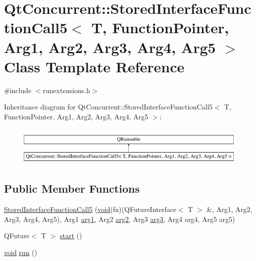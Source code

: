 \hypertarget{class_qt_concurrent_1_1_stored_interface_function_call5}{\section{Qt\-Concurrent\-:\-:Stored\-Interface\-Function\-Call5$<$ T, Function\-Pointer, Arg1, Arg2, Arg3, Arg4, Arg5 $>$ Class Template Reference}
\label{class_qt_concurrent_1_1_stored_interface_function_call5}
}


{\ttfamily \#include $<$runextensions.\-h$>$}

Inheritance diagram for Qt\-Concurrent\-:\-:Stored\-Interface\-Function\-Call5$<$ T, Function\-Pointer, Arg1, Arg2, Arg3, Arg4, Arg5 $>$\-:\begin{figure}[H]
\begin{center}
\leavevmode
\includegraphics[height=1.924399cm]{class_qt_concurrent_1_1_stored_interface_function_call5}
\end{center}
\end{figure}
\subsection*{Public Member Functions}
\begin{DoxyCompactItemize}
\item 
\hyperlink{class_qt_concurrent_1_1_stored_interface_function_call5_a60ed5a2b7e65aab39d96f7603428018c}{Stored\-Interface\-Function\-Call5} (\hyperlink{group___u_a_v_objects_plugin_ga444cf2ff3f0ecbe028adce838d373f5c}{void}(fn)(Q\-Future\-Interface$<$ T $>$ \&, Arg1, Arg2, Arg3, Arg4, Arg5), Arg1 \hyperlink{glext_8h_a4b247ab422408c1761a36f9034c2585b}{arg1}, Arg2 \hyperlink{glext_8h_a5aee5a44bf92a9837fea48e41ef0df57}{arg2}, Arg3 \hyperlink{glext_8h_a525a52cc20e1aa70741e5c7dae172f25}{arg3}, Arg4 arg4, Arg5 arg5)
\item 
Q\-Future$<$ T $>$ \hyperlink{class_qt_concurrent_1_1_stored_interface_function_call5_a6d8a8131da8d0eab30218be1a9d19fe0}{start} ()
\item 
\hyperlink{group___u_a_v_objects_plugin_ga444cf2ff3f0ecbe028adce838d373f5c}{void} \hyperlink{class_qt_concurrent_1_1_stored_interface_function_call5_ac8c29b11a62b5652dcf74f9e7fbe9235}{run} ()
\end{DoxyCompactItemize}


